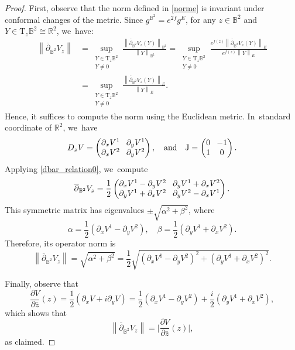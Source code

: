 \documentclass[10pt]{amsart}
\theoremstyle{plain}
\theoremstyle{definition}
\begin{document}
\begin{proof}
First, observe that the norm defined in \eqref{norme} is invariant under conformal changes of the metric. Since \(g^{\mathbb{B}^2} = e^{2f} g^E \), for any \(z \in \mathbb{B}^2 \) and \(Y \in \mathrm{T}_z \mathbb{B}^2 \cong \mathbb{R}^2 \), we~have:
\begin{align*}
\left\lVert \overline{\partial}_{\mathbb{B}^2}V_z \right\rVert
&= \sup_{\substack{Y \in \mathrm{T}_z \mathbb{B}^2 \\ Y \neq 0}} \frac{\left\lVert \overline{\partial}_{\mathbb{B}^2}V_z(Y) \right\rVert_{\mathbb{B}^2}}{\left\lVert Y \right\rVert_{\mathbb{B}^2}} = \sup_{\substack{Y \in \mathrm{T}_z \mathbb{B}^2 \\ Y \neq 0}} \frac{e^{f(z)} \left\lVert \overline{\partial}_{\mathbb{B}^2}V_z(Y) \right\rVert_E}{e^{f(z)} \left\lVert Y \right\rVert_E} \\
&= \sup_{\substack{Y \in \mathrm{T}_z \mathbb{B}^2 \\ Y \neq 0}} \frac{ \left\lVert\overline{\partial}_{\mathbb{B}^2}V_z(Y) \right\rVert_E}{\left \lVert Y \right\rVert_E}.
\end{align*}
Hence, it suffices to compute the norm using the Euclidean metric. In~standard coordinate of $\mathbb{R}^2$, we~have
\[\arraycolsep4pt
D_z V =
\begin{pmatrix}
\partial_x V^1 & \partial_y V^1 \\
\partial_x V^2 & \partial_y V^2
\end{pmatrix},
\quad
\text{and} \quad
\mathrm{J} =
\begin{pmatrix}
0 & -1 \\
1 & 0
\end{pmatrix}.
\]
Applying \eqref{dbar_relation0}, we~compute
\[\arraycolsep4pt
\overline{\partial}_{\mathbb{B}^2}V_z
=
\frac{1}{2}
\begin{pmatrix}
\partial_x V^1 - \partial_y V^2 & \partial_y V^1 + \partial_x V^2 \\
\partial_y V^1 + \partial_x V^2 & \partial_y V^2 - \partial_x V^1
\end{pmatrix}.
\]
This symmetric matrix has eigenvalues \(\pm \sqrt{\alpha^2 + \beta^2} \), where
\[
\alpha = \frac{1}{2}(\partial_x V^1 - \partial_y V^2), \quad
\beta = \frac{1}{2}(\partial_y V^1 + \partial_x V^2).
\]
Therefore, its operator norm is
\[
\left\lVert \overline{\partial}_{\mathbb{B}^2}V_z \right\rVert
= \sqrt{\alpha^2 + \beta^2}
= \frac{1}{2} \sqrt{(\partial_x V^1 - \partial_y V^2)^2 + (\partial_y V^1 + \partial_x V^2)^2}.
\]

Finally, observe that
\[
\frac{\partial V}{\partial \overline{z}}(z)
= \frac{1}{2} \left(\partial_x V + i \partial_y V \right)
= \frac{1}{2} \left(\partial_x V^1 - \partial_y V^2 \right) + \frac{i}{2}(\partial_y V^1 + \partial_x V^2),
\]
which shows that
\[
\left\lVert \overline{\partial}_{\mathbb{B}^2} V_z \right\rVert = \biggl| \frac{\partial V}{\partial \overline{z}}(z) \biggr|,
\]
as claimed.
\end{proof}
\end{document}
